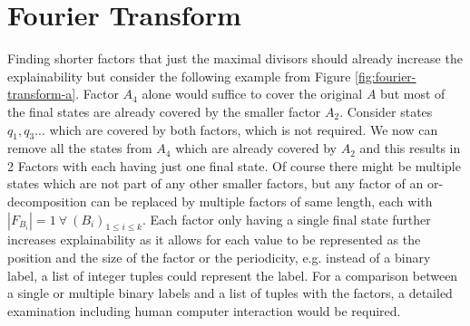 \section{Fourier Transform}
Finding shorter factors that just the maximal divisors should already increase the explainability but consider the following example from Figure \ref{fig:fourier-transform-a}. Factor $A_4$ alone would suffice to cover the original \DFA $A$ but most of the final states are already covered by the smaller factor $A_2$. Consider states $q_1, q_3 \dots$ which are covered by both factors, which is not required. We now can remove all the states from $A_4$ which are already covered by $A_2$ and this results in 2 Factors with each having just one final state. Of course there might be multiple states which are not part of any other smaller factors, but any factor of an or-decomposition can be replaced by multiple factors of same length, each with $|F_{B_i}| = 1 ~\forall~ (B_i)_{1 \leq i \leq k}$. Each factor only having a single final state further increases explainability as it allows for each value to be represented as the position and the size of the factor or the periodicity, e.g. instead of a binary label, a list of integer tuples could represent the label. For a comparison between a single or multiple binary labels and a list of tuples with the factors, a detailed examination including human computer interaction would be required.

